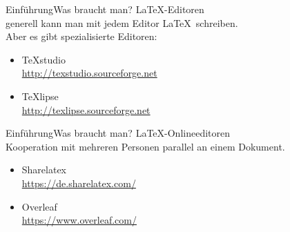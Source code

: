 \begin{frame}{Einf\"uhrung}{Was braucht man?}
    \Large\LaTeX-Editoren\normalsize\\\vspace{.5cm}
    generell kann man mit jedem Editor \LaTeX~schreiben.\\
    Aber es gibt spezialisierte Editoren:
    \begin{itemize}
        \item TeXstudio\\
        \url{http://texstudio.sourceforge.net}
        \item TeXlipse\\
        \url{http://texlipse.sourceforge.net}
    \end{itemize}
\end{frame}
\begin{frame}{Einf\"uhrung}{Was braucht man?}
    \Large\LaTeX-Onlineeditoren\normalsize\\\vspace{.5cm}
    Kooperation mit mehreren Personen parallel an einem Dokument.
    \begin{itemize}
        \item Sharelatex\\
        \url{https://de.sharelatex.com/}
        \item Overleaf\\
        \url{https://www.overleaf.com/}
    \end{itemize}
\end{frame}